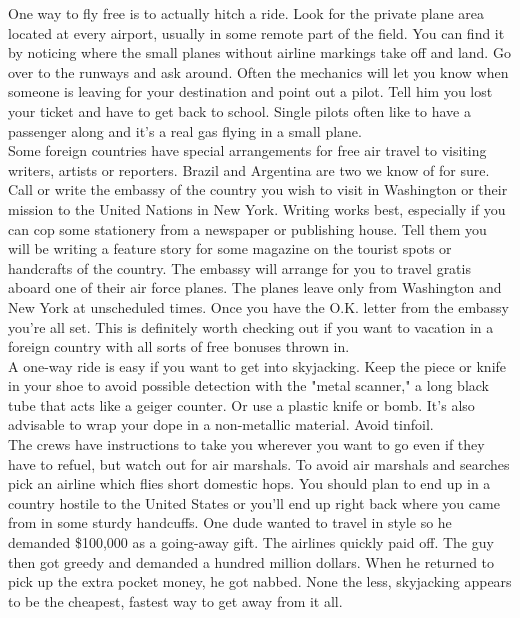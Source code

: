 \documentclass[11pt,twoside,a4paper]{book}
\begin{document}
One way to fly free is to actually hitch a ride. Look for the private plane area located at every airport, usually in some remote part of the field. You can find it by noticing where the small planes without airline markings take off and land. Go over to the runways and ask around. Often the mechanics will let you know when someone is leaving for your destination and point out a pilot. Tell him you lost your ticket and have to get back to school. Single pilots often like to have a passenger along and it's a real gas flying in a small plane.~\\

Some foreign countries have special arrangements for free air travel to visiting writers, artists or reporters. Brazil and Argentina are two we know of for sure. Call or write the embassy of the country you wish to visit in Washington or their mission to the United Nations in New York. Writing works best, especially if you can cop some stationery from a newspaper or publishing house. Tell them you will be writing a feature story for some magazine on the tourist spots or handcrafts of the country. The embassy will arrange for you to travel gratis aboard one of their air force planes. The planes leave only from Washington and New York at unscheduled times. Once you have the O.K. letter from the embassy you're all set. This is definitely worth checking out if you want to vacation in a foreign country with all sorts of free bonuses thrown in.~\\

A one-way ride is easy if you want to get into skyjacking. Keep the piece or knife in your shoe to avoid possible detection with the "metal scanner," a long black tube that acts like a geiger counter. Or use a plastic knife or bomb. It's also advisable to wrap your dope in a non-metallic material. Avoid tinfoil.~\\

The crews have instructions to take you wherever you want to go even if they have to refuel, but watch out for air marshals. To avoid air marshals and searches pick an airline which flies short domestic hops. You should plan to end up in a country hostile to the United States or you'll end up right back where you came from in some sturdy handcuffs. One dude wanted to travel in style so he demanded \$100,000 as a going-away gift. The airlines quickly paid off. The guy then got greedy and demanded a hundred million dollars. When he returned to pick up the extra pocket money, he got nabbed. None the less, skyjacking appears to be the cheapest, fastest way to get away from it all.~\\
\end{document}
